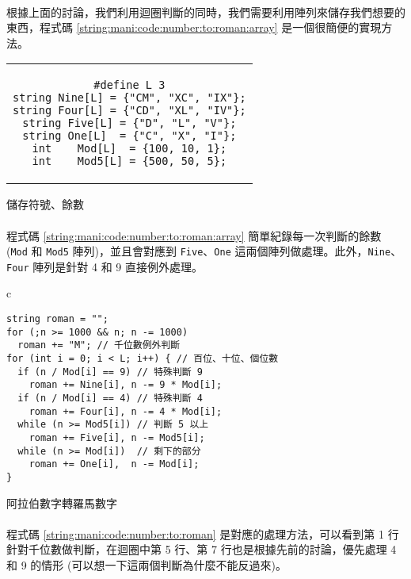 \documentclass[12pt,a4paper,oneside]{report}
\begin{document}
\begin{CJK}{UTF8}{bkai}
\paragraph{}根據上面的討論，我們利用迴圈判斷的同時，我們需要利用陣列來儲存我們想要的東西，程式碼 \ref{string:mani:code:number:to:roman:array} 是一個很簡便的實現方法。

\begin{code}[h!]
  \centering
  \begin{tabular}{c}
  \begin{lstlisting}
#define L 3
string Nine[L] = {"CM", "XC", "IX"};
string Four[L] = {"CD", "XL", "IV"};
string Five[L] = {"D", "L", "V"};
string One[L]  = {"C", "X", "I"};
int    Mod[L]  = {100, 10, 1};
int    Mod5[L] = {500, 50, 5};
  \end{lstlisting}
  \end{tabular}
  \caption{儲存符號、餘數}
  \label{string:mani:code:number:to:roman:array}
\end{code}

\paragraph{}程式碼 \ref{string:mani:code:number:to:roman:array} 簡單紀錄每一次判斷的餘數 (\lstinline!Mod! 和 \lstinline!Mod5! 陣列)，並且會對應到 \lstinline!Five!、\lstinline!One! 這兩個陣列做處理。此外，\lstinline!Nine!、\lstinline!Four! 陣列是針對 4 和 9 直接例外處理。

\begin{code}[h!]
  \centering
  \begin{tabular}{c}
  \begin{lstlisting}
string roman = "";
for (;n >= 1000 && n; n -= 1000)
  roman += "M"; // 千位數例外判斷
for (int i = 0; i < L; i++) { // 百位、十位、個位數
  if (n / Mod[i] == 9) // 特殊判斷 9
    roman += Nine[i], n -= 9 * Mod[i];
  if (n / Mod[i] == 4) // 特殊判斷 4
    roman += Four[i], n -= 4 * Mod[i];
  while (n >= Mod5[i]) // 判斷 5 以上
    roman += Five[i], n -= Mod5[i];
  while (n >= Mod[i])  // 剩下的部分
    roman += One[i],  n -= Mod[i];
}
  \end{lstlisting}
  \end{tabular}
  \caption{阿拉伯數字轉羅馬數字}
  \label{string:mani:code:number:to:roman}
\end{code}

\paragraph{}程式碼 \ref{string:mani:code:number:to:roman} 是對應的處理方法，可以看到第 1 行針對千位數做判斷，在迴圈中第 5 行、第 7 行也是根據先前的討論，優先處理 4 和 9 的情形 (可以想一下這兩個判斷為什麼不能反過來)。


\end{CJK}
\end{document}
